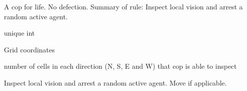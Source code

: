 \documentclass[letterpaper,10pt,english]{sphinxmanual}
\begin{document}
\begin{fulllineitems}
\label{\detokenize{index:examples.epstein_civil_violence.epstein_civil_violence.agent.Cop}}
A cop for life.  No defection.
Summary of rule: Inspect local vision and arrest a random active agent.

\begin{fulllineitems}
\label{\detokenize{index:examples.epstein_civil_violence.epstein_civil_violence.agent.Cop.unique_id}}
unique int

\end{fulllineitems}



\begin{fulllineitems}
Grid coordinates

\end{fulllineitems}


\begin{fulllineitems}
\label{\detokenize{index:examples.epstein_civil_violence.epstein_civil_violence.agent.Cop.vision}}
number of cells in each direction (N, S, E and W) that cop is
able to inspect

\end{fulllineitems}


\begin{fulllineitems}
\label{\detokenize{index:examples.epstein_civil_violence.epstein_civil_violence.agent.Cop.step}}
Inspect local vision and arrest a random active agent. Move if
applicable.


\end{fulllineitems}
\end{fulllineitems}
\end{document}
